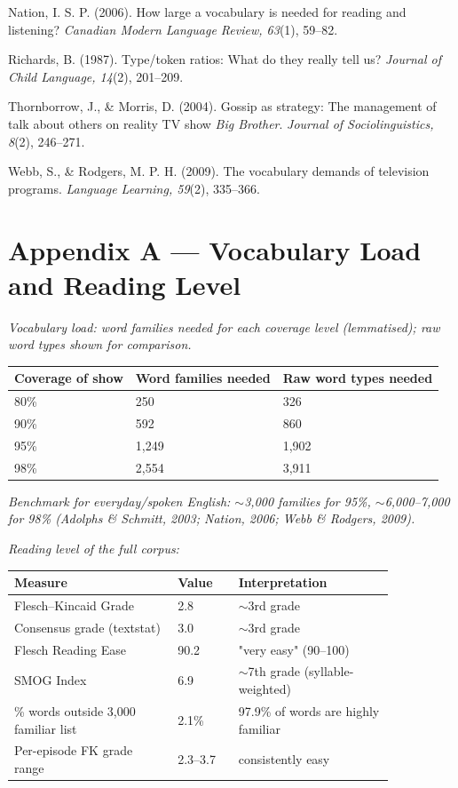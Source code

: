 \documentclass[11pt]{article}
\begin{document}
Nation, I. S. P. (2006). How large a vocabulary is needed for reading and listening? \emph{Canadian Modern Language Review, 63}(1), 59--82.

Richards, B. (1987). Type/token ratios: What do they really tell us? \emph{Journal of Child Language, 14}(2), 201--209.

Thornborrow, J., \& Morris, D. (2004). Gossip as strategy: The management of talk about others on reality TV show \emph{Big Brother}. \emph{Journal of Sociolinguistics, 8}(2), 246--271.

Webb, S., \& Rodgers, M. P. H. (2009). The vocabulary demands of television programs. \emph{Language Learning, 59}(2), 335--366.


\FloatBarrier
\needspace{0.18\textheight}
\section*{Appendix A --- Vocabulary Load and Reading Level}

\emph{Vocabulary load: word families needed for each coverage level (lemmatised); raw word types shown for comparison.}

\begin{center}
\begin{tabular}{lll}
\toprule
Coverage of show & Word families needed & Raw word types needed \\
\midrule
80\% & 250 & 326 \\
90\% & 592 & 860 \\
95\% & 1,249 & 1,902 \\
98\% & 2,554 & 3,911 \\
\bottomrule
\end{tabular}
\end{center}

\emph{Benchmark for everyday/spoken English: $\sim$3,000 families for 95\%, $\sim$6,000--7,000 for 98\% (Adolphs \& Schmitt, 2003; Nation, 2006; Webb \& Rodgers, 2009).}

\emph{Reading level of the full corpus:}

\begin{center}
\begin{tabular}{p{0.431\linewidth}lp{0.419\linewidth}}
\toprule
Measure & Value & Interpretation \\
\midrule
Flesch--Kincaid Grade & 2.8 & $\sim$3rd grade \\
Consensus grade (textstat) & 3.0 & $\sim$3rd grade \\
Flesch Reading Ease & 90.2 & "very easy" (90--100) \\
SMOG Index & 6.9 & $\sim$7th grade (syllable-weighted) \\
\% words outside 3,000 familiar list & 2.1\% & 97.9\% of words are highly familiar \\
Per-episode FK grade range & 2.3--3.7 & consistently easy \\
\bottomrule
\end{tabular}
\end{center}
\end{document}
